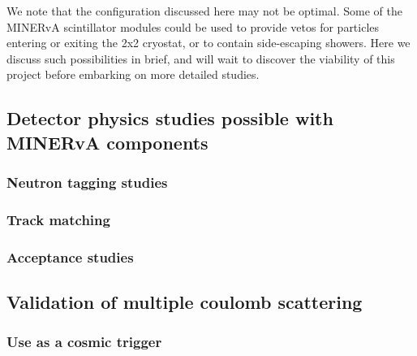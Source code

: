 We note that the configuration discussed here may not be optimal. Some of the MINERvA scintillator modules could be used to provide vetos for particles entering or exiting the 2x2 cryostat, or to contain side-escaping showers. Here we discuss such possibilities in brief, and will wait to discover the viability of this project before embarking on more detailed studies.

\subsection{Detector physics studies possible with MINERvA components}

\subsubsection{Neutron tagging studies}

\subsubsection{Track matching}

\subsubsection{Acceptance studies}

\subsection{Validation of multiple coulomb scattering}

\subsubsection{Use as a cosmic trigger}
